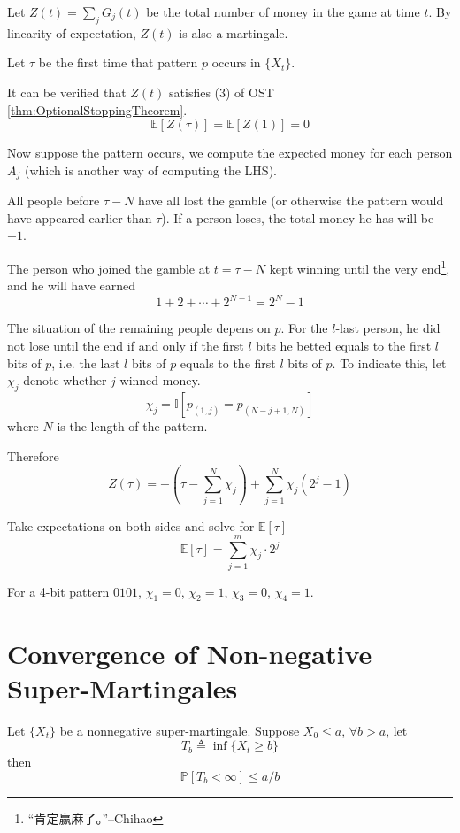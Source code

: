             Let $Z(t) = \sum_j G_j(t)$ be the total number of money in the game at time $t$. By linearity of expectation, $Z(t)$ is also a martingale.

            Let $\tau$ be the first time that pattern $p$ occurs in $\{X_t\}$.

            It can be verified that $Z(t)$ satisfies (3) of OST \ref{thm:OptionalStoppingTheorem}.
            \[ \mathbb{E}[Z(\tau)] = \mathbb{E}[Z(1)] = 0 \]

            Now suppose the pattern occurs, we compute the expected money for each person $A_j$ (which is another way of computing the LHS).

            All people before $\tau - N$ have all lost the gamble (or otherwise the pattern would have appeared earlier than $\tau$). If a person loses, the total money he has will be $-1$. 

            The person who joined the gamble at $t = \tau-N$ kept winning until the very end\footnote{“肯定赢麻了。”--Chihao}, and he will have earned
            \[ 1 + 2 + \cdots + 2^{N-1} = 2^N-1 \]

            The situation of the remaining people depens on $p$. For the $l$-last person, he did not lose until the end if and only if the first $l$ bits he betted equals to the first $l$ bits of $p$, i.e. the last $l$ bits of $p$ equals to the first $l$ bits of $p$. To indicate this, let $\chi_j$ denote whether $j$ winned money.
            \[ \chi_j = \mathbb{I}[p_{(1,j)} = p_{(N-j+1,N)}] \]
            where $N$ is the length of the pattern.

            Therefore
            \[Z(\tau) = -\left(\tau - \sum_{j=1}^N \chi_j\right) + \sum_{j=1}^N \chi_j(2^j-1)\]

            Take expectations on both sides and solve for $\mathbb{E}[\tau]$
            \[\mathbb{E}[\tau] = \sum_{j=1}^m\chi_j \cdot 2^j\]

            For a 4-bit pattern $0101$, $\chi_1=0$, $\chi_2 = 1$, $\chi_3=0$, $\chi_4=1$.


\section{Convergence of Non-negative Super-Martingales}
    \begin{proposition}\label{prop:BoundOnSuperMartingale}
        Let $\{X_t\}$ be a nonnegative super-martingale. Suppose $X_0 \le a $, $\forall b > a$, let
        \[ T_b \triangleq \inf\{ X_t \ge b \} \]
        then
        \[ \mathbb{P}[T_b < \infty] \le a/b \]
    \end{proposition}

